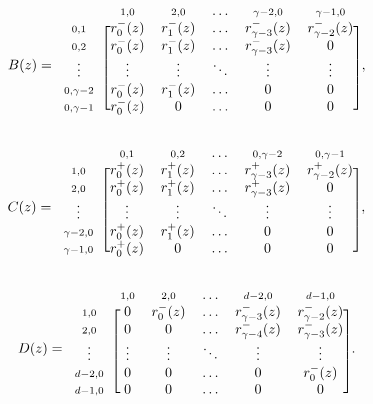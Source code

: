 \documentclass{article}
\begin{document}
\begin{equation*}
B(z) = 
\begin{blockarray}{cccccc}
   & \scriptstyle{1,0} & \scriptstyle{2,0} & \ldots &
    \scriptstyle{\gamma-2,0} & \scriptstyle{\gamma-1,0} \\
\begin{block}{c[ccccc]}
\scriptstyle{0,1} & r_0^-(z) & r_1^-(z) & \ldots &
    r_{\gamma-3}^-(z) & r_{\gamma-2}^-(z) \\
\scriptstyle{0,2} & r_0^-(z) & r_1^-(z) & \ldots &
    r_{\gamma-3}^-(z) & 0 \\
\vdots & \vdots & \vdots & \ddots & \vdots & \vdots \\
\scriptstyle{0,\gamma-2} & r_0^-(z) & r_1^-(z) & \ldots & 0 & 0 \\
\scriptstyle{0,\gamma-1} & r_0^-(z) & 0 & \ldots & 0 & 0 \\
\end{block}
\end{blockarray},
\end{equation*}

\begin{equation*}
C(z) = 
\begin{blockarray}{cccccc}
   & \scriptstyle{0,1} & \scriptstyle{0,2} & \ldots &
    \scriptstyle{0,\gamma-2} & \scriptstyle{0,\gamma-1} \\
\begin{block}{c[ccccc]}
\scriptstyle{1,0} & r_0^+(z) & r_1^+(z) & \ldots &
    r_{\gamma-3}^+(z) & r_{\gamma-2}^+(z) \\
\scriptstyle{2,0} & r_0^+(z) & r_1^+(z) & \ldots &
    r_{\gamma-3}^+(z) & 0 \\
\vdots & \vdots & \vdots & \ddots & \vdots & \vdots \\
\scriptstyle{\gamma-2,0} & r_0^+(z) & r_1^+(z) & \ldots & 0 & 0 \\
\scriptstyle{\gamma-1,0} & r_0^+(z) & 0 & \ldots & 0 & 0 \\
\end{block}
\end{blockarray},
\end{equation*}

\begin{equation*}
D(z) = 
\begin{blockarray}{cccccc}
   & \scriptstyle{1,0} & \scriptstyle{2,0} & \ldots &
    \scriptstyle{d-2,0} & \scriptstyle{d-1,0} \\
\begin{block}{c[ccccc]}
\scriptstyle{1,0} & 0 & r_0^-(z) & \ldots &
    r_{\gamma-3}^-(z) & r_{\gamma-2}^-(z) \\
\scriptstyle{2,0} & 0 & 0 & \ldots &
    r_{\gamma-4}^-(z) & r_{\gamma-3}^-(z) \\
\vdots & \vdots & \vdots & \ddots & \vdots & \vdots \\
\scriptstyle{d-2,0} & 0 & 0 & \ldots & 0 & r_0^-(z) \\
\scriptstyle{d-1,0} & 0 & 0 & \ldots & 0 & 0 \\
\end{block}
\end{blockarray}.
\end{equation*}
\end{document}
